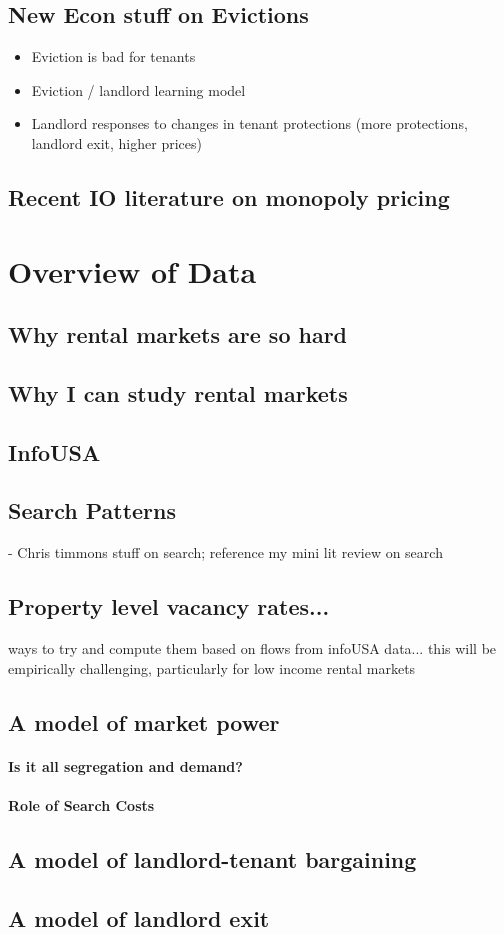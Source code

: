 \documentclass{article}
\begin{document}
\subsection{New Econ stuff on Evictions}
\begin{itemize}
    \item Eviction is bad for tenants
    \item Eviction / landlord learning model
    \item Landlord responses to changes in tenant protections (more protections, landlord exit, higher prices)
\end{itemize}

\subsection{Recent IO literature on monopoly pricing}


\section{Overview of Data}

\subsection{Why rental markets are so hard}
\subsection{Why I can study rental markets}
\subsection{InfoUSA}
\subsection{Search Patterns}
- Chris timmons stuff on search; reference my mini lit review on search
\subsection{Property level vacancy rates...}
ways to try and compute them based on flows from infoUSA data... this will be empirically challenging, particularly for low income rental markets 

\subsection{A model of market power}
\paragraph{Is it all segregation and demand?}
\paragraph{Role of Search Costs}



\subsection{A model of landlord-tenant bargaining}
\subsection{A model of landlord exit}
\end{document}
